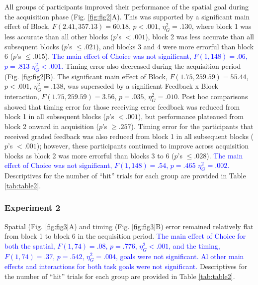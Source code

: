 \documentclass[
  man, donotrepeattitle,floatsintext]{apa7}
\begin{document}
All groups of participants improved their performance of the spatial goal during the acquisition phase (Fig. \ref{fig:fig2}A). This was supported by a significant main effect of Block, \(F(2.41,357.13) = 60.18\), \(p < .001\), \(\eta_{G}^2 = .130\), where block 1 was less accurate than all other blocks (\(p\)'s \(< .001\)), block 2 was less accurate than all subsequent blocks (\(p\)'s \(\leq .021\)), and blocks 3 and 4 were more errorful than block 6 (\(p\)'s \(\leq .015\)). \textcolor{blue}{The main effect of Choice was not significant, $F(1,148) = .06$, $p = .813$ $\eta_{G}^2 < .001$.} Timing error also decreased during the acquisition period (Fig. \ref{fig:fig2}B). The significant main effect of Block, \(F(1.75,259.59) = 55.44\), \(p < .001\), \(\eta_{G}^2 = .138\), was superseded by a significant Feedback x Block interaction, \(F(1.75, 259.59) = 3.56\), \(p = .035\), \(\eta_{G}^2 = .010\). Post hoc comparisons showed that timing error for those receiving error feedback was reduced from block 1 in all subsequent blocks (\(p\)'s \(< .001\)), but performance plateaued from block 2 onward in acquisition (\(p\)'s \(\geq .257\)). Timing error for the participants that received graded feedback was also reduced from block 1 in all subsequent blocks (\(p\)'s \(< .001\)); however, these participants continued to improve across acquisition blocks as block 2 was more errorful than blocks 3 to 6 (\(p\)'s \(\leq .028\)). \textcolor{blue}{The main effect of Choice was not significant, $F(1,148) = .54$, $p = .465$ $\eta_{G}^2 = .002$.} Descriptives for the number of ``hit'' trials for each group are provided in Table \ref{tab:table2}.

\hypertarget{experiment-2-3}{%
\subsubsection{Experiment 2}\label{experiment-2-3}}

Spatial (Fig. \ref{fig:fig3}A) and timing (Fig. \ref{fig:fig3}B) error remained relatively flat from block 1 to block 6 in the acquisition period. \textcolor{blue}{The main effect of Choice for both the spatial, $F(1,74) = .08$, $p = .776$, $\eta_{G}^2 < .001$, and the timing, $F(1,74) = .37$, $p = .542$, $\eta_{G}^2 = .004$, goals were not significant. Al other main effects and interactions for both task goals were not significant.} Descriptives for the number of ``hit'' trials for each group are provided in Table \ref{tab:table2}.
\end{document}
